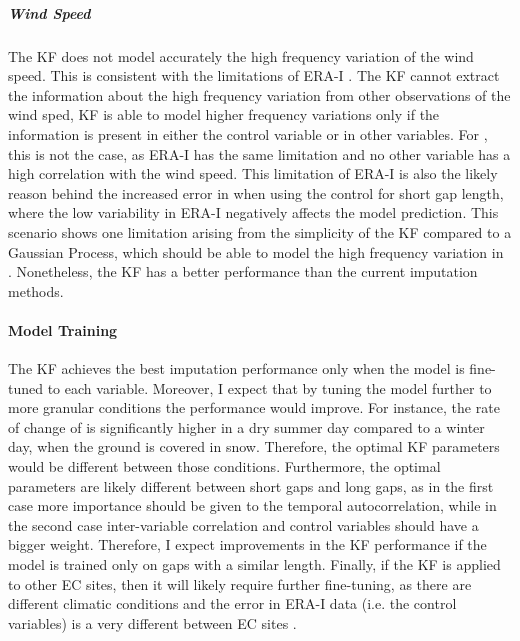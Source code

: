 \documentclass{article}
\begin{document}
\subparagraph{Wind Speed} The KF does not model accurately the high frequency variation of the wind speed. This is consistent with the limitations of ERA-I \cite{vuichard_filling_2015}. The KF cannot extract the information about the high frequency variation from other observations of the wind sped, KF is able to model higher frequency variations only if the information is present in either the control variable or in other variables. For , this is not the case, as ERA-I has the same limitation and no other variable has a high correlation with the wind speed. This limitation of ERA-I is also the likely reason behind the increased error in  when using the control for short gap length, where the low variability in ERA-I negatively affects the model prediction.
This scenario shows one limitation arising from the simplicity of the KF compared to a Gaussian Process, which should be able to model the high frequency variation in . Nonetheless, the KF has a better performance than the current imputation methods.

\paragraph{Model Training} The KF achieves the best imputation performance only when the model is fine-tuned to each variable.
Moreover, I expect that by tuning the model further to more granular conditions the performance would improve.
For instance, the rate of change of  is significantly  higher in a dry summer day compared to a winter day, when the ground is covered in snow. Therefore, the optimal KF parameters would be different between those conditions.
Furthermore, the optimal parameters are likely different between short gaps and long gaps, as in the first case more importance should be given to the temporal autocorrelation, while in the second case inter-variable correlation and control variables should have a bigger weight. Therefore, I expect improvements in the KF performance if the model is trained only on gaps with a similar length.
Finally, if the KF is applied to other EC sites, then it will likely require further fine-tuning, as there are different climatic conditions and the error in ERA-I data (i.e. the control variables) is a very different between EC sites \cite{vuichard_filling_2015}.
\end{document}
